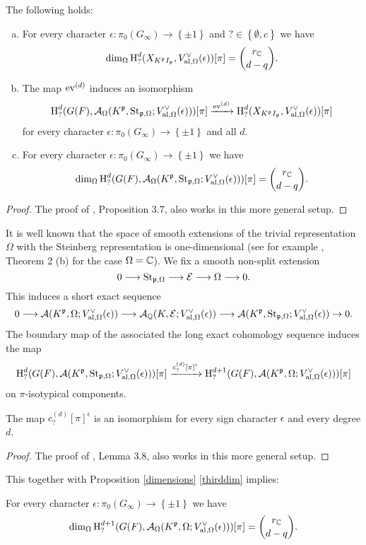 \begin{Pro}\label{dimensions}
The following holds:
\begin{enumerate}[(a)]
\item\label{firstdim} For every character $\epsilon\colon \pi_0(G_\infty)\to\left\{\pm 1 \right\}$ and $?\in\left\{\emptyset,c\right\}$ we have
 $$\dim_\Omega \operatorname{H}^{d}_?(X_{K^{\mathfrak{p}} I_{\mathfrak{p}}},V_{\operatorname{al},\Omega}^\vee(\epsilon))[\pi]= \binom{r_{\mathbb{C}}}{d-q}.$$
\item\label{seconddim} The map $\operatorname{ev}^{(d)}$ induces an isomorphism
$$\operatorname{H}^{d}_?(G(F),\mathcal{A}_\Omega(K^{\mathfrak{p}},\operatorname{St}_{\mathfrak{p},\Omega};V_{\operatorname{al},\Omega}^\vee(\epsilon)))[\pi]\xrightarrow{\operatorname{ev}^{(d)}} \operatorname{H}^{d}_?(X_{K^{\mathfrak{p}} I_{\mathfrak{p}}},V_{\operatorname{al},\Omega}^\vee(\epsilon))[\pi]$$
for every character $\epsilon\colon \pi_0(G_\infty)\to\left\{\pm 1 \right\}$ and all $d$.
\item\label{thirddim} For every character $\epsilon\colon \pi_0(G_\infty)\to\left\{\pm 1 \right\}$ we have
$$\dim_\Omega \operatorname{H}^{d}_?(G(F),\mathcal{A}_\Omega(K^{\mathfrak{p}},\operatorname{St}_{\mathfrak{p},\Omega};V_{\operatorname{al},\Omega}^\vee(\epsilon)))[\pi] = \binom{r_{\mathbb{C}}}{d-q}.$$
\end{enumerate}
\end{Pro}
\begin{proof}
The proof of \cite{Ge3}, Proposition 3.7, also works in this more general setup.
\end{proof}


It is well known that the space of smooth extensions of the trivial representation $\Omega$ with the Steinberg representation is one-dimensional (see for example \cite{Cass}, Theorem 2 (b) for the case $\Omega=\mathbb{C}$).
We fix a smooth non-split extension
$$0\longrightarrow \operatorname{St}_{\mathfrak{p},\Omega} \longrightarrow \mathcal{E} \longrightarrow \Omega \longrightarrow 0.$$
This induces a short exact sequence
$$0\longrightarrow \mathcal{A}(K^{\mathfrak{p}},\Omega;V_{\operatorname{al},\Omega}^\vee(\epsilon)) \longrightarrow \mathcal{A}_{\mathbb{Q}}(K,\mathcal{E};V_{\operatorname{al},\Omega}^\vee(\epsilon))\longrightarrow \mathcal{A}(K^{\mathfrak{p}},\operatorname{St}_{\mathfrak{p},\Omega};V_{\operatorname{al},\Omega}^\vee(\epsilon)) \to 0.$$
The boundary map of the associated the long exact cohomology sequence induces the map
$$\operatorname{H}^{d}_?(G(F),\mathcal{A}(K^{\mathfrak{p}},\operatorname{St}_{\mathfrak{p},\Omega};V_{\operatorname{al},\Omega}^\vee(\epsilon)))[\pi]\xrightarrow{c^{(d)}_?[\pi]^{\epsilon}} \operatorname{H}^{d+1}_?(G(F),\mathcal{A}(K^{\mathfrak{p}},\Omega;V_{\operatorname{al},\Omega}^\vee(\epsilon)))[\pi]$$
on $\pi$-isotypical components.

\begin{Lem}\label{smoothcup}
The map $c^{(d)}_?[\pi]^{\epsilon}$ is an isomorphism for every sign character $\epsilon$ and every degree $d$.
\end{Lem}
\begin{proof}
The proof of \cite{Ge3}, Lemma 3.8, also works in this more general setup.
\end{proof}

This together with Proposition \ref{dimensions} \eqref{thirddim} implies:
\begin{Cor}\label{fourthdim}
For every character $\epsilon\colon \pi_0(G_\infty)\to\left\{\pm 1 \right\}$ we have
$$\dim_\Omega \operatorname{H}^{d+1}_?(G(F),\mathcal{A}_\Omega(K^{\mathfrak{p}},\Omega;V_{\operatorname{al},\Omega}^\vee(\epsilon)))[\pi] = \binom{r_{\mathbb{C}}}{d-q}.$$
\end{Cor}



